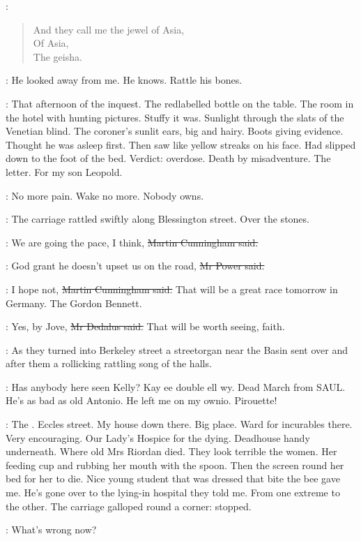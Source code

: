 \BloomInt:
\begin{verse}
    And they call me the jewel of Asia, \\
    Of Asia, \\
    The geisha.
\end{verse}

\BloomInt:
He looked away from me.
He knows.
Rattle his bones.

\BloomInt:
That afternoon of the inquest.
The redlabelled bottle on the table.
The room in the hotel with hunting pictures.
Stuffy it was.
Sunlight through the slats of the Venetian blind.
The coroner's sunlit ears, big and hairy.
Boots giving evidence.
Thought he was asleep first.
Then saw like yellow streaks on his face.
Had slipped down to the foot of the bed.
Verdict:
overdose.
Death by misadventure.
The letter.
For my son Leopold.

\BloomInt:
No more pain.
Wake no more.
Nobody owns.

:
The carriage rattled swiftly along Blessington street.
Over the stones.

\cunningham:
We are going the pace, I think,
\sout{Martin Cunningham said.}

\power:
God grant he doesn't upset us on the road,
\sout{Mr Power said.}

\cunningham:
I hope not,
\sout{Martin Cunningham said.}
That will be a great race tomorrow in Germany.
The Gordon Bennett.

\simon:
Yes, by Jove,
\sout{Mr Dedalus said.}
That will be worth seeing, faith.

:
As they turned into Berkeley street
a streetorgan near the Basin sent over and after them
a rollicking rattling song of the halls.

:
Has anybody here seen Kelly?
Kay ee double ell wy.
Dead March from SAUL.
He's as bad
as old Antonio.
He left me on my ownio.
Pirouette!

\BloomInt:
The .
Eccles street.
My house down there.
Big place.
Ward for incurables there.
Very encouraging.
Our Lady's Hospice for the dying.
Deadhouse handy underneath.
Where old Mrs Riordan died.
They look terrible the women.
Her feeding cup and rubbing her mouth with the spoon.
Then the screen round her bed for her to die.
Nice young student that was dressed that bite the bee gave me.
He's gone over to the lying-in hospital they told me.
From one extreme to the other.
The carriage galloped round a corner:
stopped.

\cunningham:
What's wrong now?

